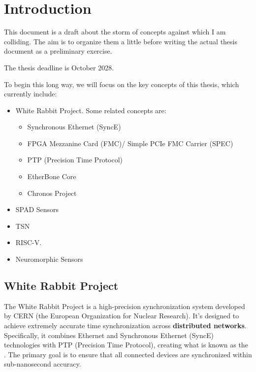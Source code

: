\section{Introduction}

\label{intro}

This document is a draft about the storm of concepts against which I am colliding.
The aim is to organize them a little before writing the actual thesis document as a preliminary exercise.

\vspace{5 mm}

\noindent The thesis deadline is October 2028.

\vspace{5 mm}

\noindent To begin this long way, we will focus on the key concepts of this thesis, which currently include:

\begin{itemize}
\item White Rabbit Project. Some related concepts are:
\begin{itemize}
\item Synchronous Ethernet (SyncE) 
\item FPGA Mezzanine Card (FMC)/ Simple PCIe FMC Carrier (SPEC)
\item PTP (Precision Time Protocol) 
\item EtherBone Core
\item Chronos Project
\end{itemize}
\item SPAD Sensors
\item TSN
\item RISC-V.
\item Neuromorphic Sensors
\end{itemize}

\subsection{White Rabbit Project}

The White Rabbit Project \cite{white-rabbit} is a high-precision synchronization system developed by CERN (the European Organization for Nuclear Research).
It’s designed to achieve extremely accurate time synchronization across \textbf{distributed networks}. 
Specifically, it combines Ethernet and Synchronous Ethernet (SyncE) technologies with PTP (Precision Time Protocol), creating what is known as the .
The primary goal is to ensure that all connected devices are synchronized within sub-nanosecond accuracy.

